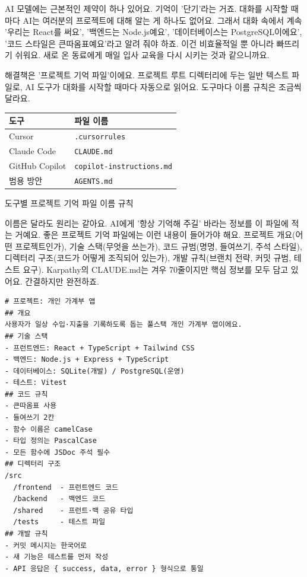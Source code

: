 


AI 모델에는 근본적인 제약이 하나 있어요. 기억이 '단기'라는 거죠. 대화를 시작할 때마다 AI는 여러분의 프로젝트에 대해 알는 게 하나도 없어요. 그래서 대화 속에서 계속 '우리는 React를 써요', '백엔드는 Node.js예요', '데이터베이스는 PostgreSQL이에요', '코드 스타일은 큰따옴표예요'라고 알려 줘야 하죠. 이건 비효율적일 뿐 아니라 빠뜨리기 쉬워요. 새로 온 동료에게 매일 입사 교육을 다시 시키는 것과 같으니까요.

해결책은 '프로젝트 기억 파일'이에요. 프로젝트 루트 디렉터리에 두는 일반 텍스트 파일로, AI 도구가 대화를 시작할 때마다 자동으로 읽어요. 도구마다 이름 규칙은 조금씩 달라요.

\begin{center}
\begin{tabularx}{\linewidth}{|X|X|}
\hline
\textbf{도구} & \textbf{파일 이름} \tabularnewline
\hline
Cursor & \texttt{.\allowbreak cursorrules} \tabularnewline
Claude Code & \texttt{CLAUDE.\allowbreak md} \tabularnewline
GitHub Copilot & \texttt{copilot-\allowbreak instructions.\allowbreak md} \tabularnewline
범용 방안 & \texttt{AGENTS.\allowbreak md} \tabularnewline
\hline
\end{tabularx}
\end{center}

\begin{center}\small\color{gray}도구별 프로젝트 기억 파일 이름 규칙\end{center}

이름은 달라도 원리는 같아요. AI에게 '항상 기억해 주길' 바라는 정보를 이 파일에 적는 거예요. 좋은 프로젝트 기억 파일에는 이런 내용이 들어가야 해요. 프로젝트 개요(어떤 프로젝트인가), 기술 스택(무엇을 쓰는가), 코드 규범(명명, 들여쓰기, 주석 스타일), 디렉터리 구조(코드가 어떻게 조직되어 있는가), 개발 규칙(브랜치 전략, 커밋 규범, 테스트 요구). Karpathy의 CLAUDE.md는 겨우 70줄이지만 핵심 정보를 모두 담고 있어요. 간결하지만 완전하죠.

\begin{lstlisting}
# 프로젝트: 개인 가계부 앱
## 개요
사용자가 일상 수입·지출을 기록하도록 돕는 풀스택 개인 가계부 앱이에요.
## 기술 스택
- 프런트엔드: React + TypeScript + Tailwind CSS
- 백엔드: Node.js + Express + TypeScript
- 데이터베이스: SQLite(개발) / PostgreSQL(운영)
- 테스트: Vitest
## 코드 규칙
- 큰따옴표 사용
- 들여쓰기 2칸
- 함수 이름은 camelCase
- 타입 정의는 PascalCase
- 모든 함수에 JSDoc 주석 필수
## 디렉터리 구조
/src
  /frontend  - 프런트엔드 코드
  /backend   - 백엔드 코드
  /shared    - 프런트·백 공유 타입
  /tests     - 테스트 파일
## 개발 규칙
- 커밋 메시지는 한국어로
- 새 기능은 테스트를 먼저 작성
- API 응답은 { success, data, error } 형식으로 통일
\end{lstlisting}

